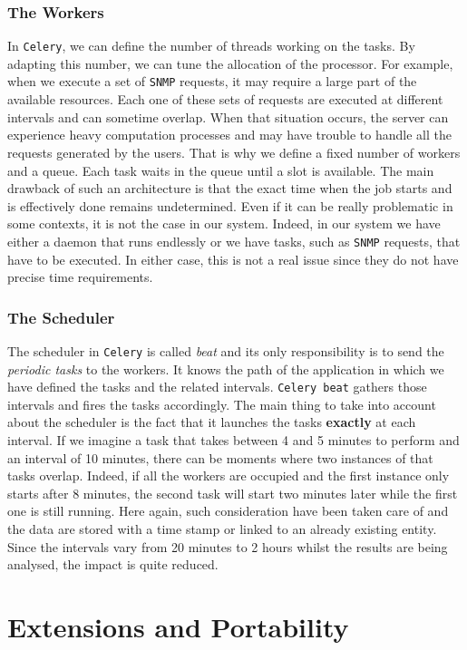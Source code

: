 \subsubsection*{The Workers}
In \texttt{Celery}, we can define the number of threads working on the tasks. By adapting this number, we can tune the allocation of the processor. For example, when we execute a set of \texttt{SNMP} requests, it may require a large part of the available resources. Each one of these sets of requests are executed at different intervals and can sometime overlap. When that situation occurs, the server can experience heavy computation processes and may have trouble to handle all the requests generated by the users. That is why we define a fixed number of workers and a queue. Each task waits in the queue until a slot is available. The main drawback of such an architecture is that the exact time when the job starts and is effectively done remains undetermined. Even if it can be really problematic in some contexts, it is not the case in our system. Indeed, in our system we have either a daemon that runs endlessly or we have tasks, such as \texttt{SNMP} requests, that have to be executed. In either case, this is not a real issue since they do not have precise time requirements. 


\subsubsection*{The Scheduler}
The scheduler in \texttt{Celery} is called \emph{beat} and its only responsibility is to send the \emph{periodic tasks} to the workers. It knows the path of the application in which we have defined the tasks and the related intervals. \texttt{Celery beat} gathers those intervals and fires the tasks accordingly. The main thing to take into account about the scheduler is the fact that it launches the tasks \textbf{exactly} at each interval. If we imagine a task that takes between 4 and 5 minutes to perform and an interval of 10 minutes, there can be moments where two instances of that tasks overlap. Indeed, if all the workers are occupied and the first instance only starts after 8 minutes, the second task will start two minutes later while the first one is still running. Here again, such consideration have been taken care of and the data are stored with a time stamp or linked to an already existing entity. Since the intervals vary from 20 minutes to 2 hours whilst the results are being analysed, the impact is quite reduced. 

\section{Extensions and Portability}

